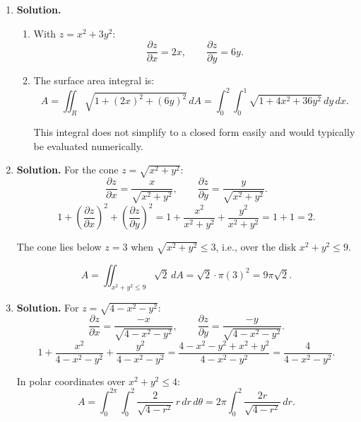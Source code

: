 \begin{enumerate}
\begin{enumerate}
\item Evaluating the $r$-integral:
\[
\int_0^2(4r+r^2)\,dr = \left[2r^2+\frac{r^3}{3}\right]_0^2 = 8+\frac{8}{3} = \frac{32}{3}.
\]
\[
M = 2\pi\cdot\frac{32}{3} = \boxed{\frac{64\pi}{3}}.
\]

\item Average density:
\[
\rho_{\text{avg}} = \frac{M}{\text{Area}} = \frac{64\pi/3}{\pi\cdot 4} = \frac{64}{12} = \boxed{\frac{16}{3}}.
\]
\end{enumerate}

\item \textbf{Solution.}
\begin{enumerate}
\item With $z = x^2+3y^2$:
\[
\frac{\partial z}{\partial x} = 2x, \qquad \frac{\partial z}{\partial y} = 6y.
\]

\item The surface area integral is:
\[
A = \iint_R\sqrt{1+(2x)^2+(6y)^2}\,dA = \boxed{\int_0^2\int_0^1\sqrt{1+4x^2+36y^2}\,dy\,dx}.
\]

This integral does not simplify to a closed form easily and would typically be evaluated numerically.
\end{enumerate}

\item \textbf{Solution.}
For the cone $z = \sqrt{x^2+y^2}$:
\[
\frac{\partial z}{\partial x} = \frac{x}{\sqrt{x^2+y^2}}, \qquad \frac{\partial z}{\partial y} = \frac{y}{\sqrt{x^2+y^2}}.
\]
\[
1+\left(\frac{\partial z}{\partial x}\right)^2+\left(\frac{\partial z}{\partial y}\right)^2 = 1+\frac{x^2}{x^2+y^2}+\frac{y^2}{x^2+y^2} = 1+1 = 2.
\]

The cone lies below $z=3$ when $\sqrt{x^2+y^2}\le 3$, i.e., over the disk $x^2+y^2\le 9$.

\[
A = \iint_{x^2+y^2\le 9}\sqrt{2}\,dA = \sqrt{2}\cdot\pi(3)^2 = \boxed{9\pi\sqrt{2}}.
\]

\item \textbf{Solution.}
For $z = \sqrt{4-x^2-y^2}$:
\[
\frac{\partial z}{\partial x} = \frac{-x}{\sqrt{4-x^2-y^2}}, \qquad \frac{\partial z}{\partial y} = \frac{-y}{\sqrt{4-x^2-y^2}}.
\]
\[
1+\frac{x^2}{4-x^2-y^2}+\frac{y^2}{4-x^2-y^2} = \frac{4-x^2-y^2+x^2+y^2}{4-x^2-y^2} = \frac{4}{4-x^2-y^2}.
\]

In polar coordinates over $x^2+y^2\le 4$:
\[
A = \int_0^{2\pi}\int_0^2\frac{2}{\sqrt{4-r^2}}\,r\,dr\,d\theta = 2\pi\int_0^2\frac{2r}{\sqrt{4-r^2}}\,dr.
\]


\end{enumerate}
